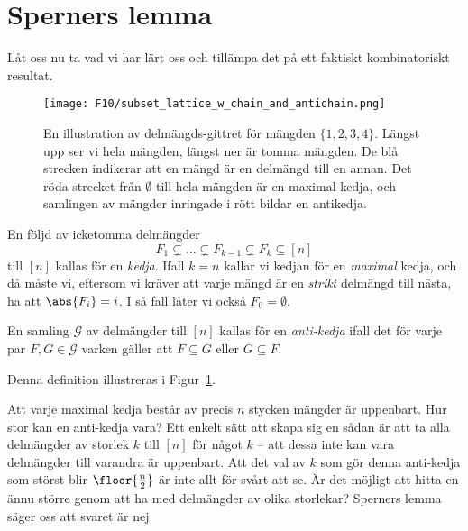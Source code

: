 \documentclass[nobib]{tufte-handout}
\begin{document}
\section{Sperners lemma}

Låt oss nu ta vad vi har lärt oss och tillämpa det på ett faktiskt kombinatoriskt resultat.

\begin{figure}
    \centering
    \texttt{[image: F10/subset\_lattice\_w\_chain\_and\_antichain.png]}
    \caption{En illustration av delmängds-gittret för mängden $\{1,2,3,4\}$. Längst upp ser vi hela mängden, längst ner är tomma mängden. De blå strecken indikerar att en mängd är en delmängd till en annan. Det röda strecket från $\emptyset$ till hela mängden är en maximal kedja, och samlingen av mängder inringade i rött bildar en antikedja.}
    \label{fig:chain_and_antichain}
\end{figure}

\begin{definition}
    En följd av icketomma delmängder
    $$F_1 \subsetneq \ldots \subsetneq F_{k-1} \subsetneq F_k \subseteq [n]$$
    till $[n]$ kallas för en \emph{kedja}. Ifall $k=n$ kallar vi kedjan för en \emph{maximal} kedja, och då måste vi, eftersom vi kräver att varje mängd är en \emph{strikt} delmängd till nästa, ha att $\abs{F_i} = i$. I så fall låter vi också $F_0 = \emptyset$.

    En samling $\mathcal{G}$ av delmängder till $[n]$ kallas för en \emph{anti-kedja} ifall det för varje par $F, G \in \mathcal{G}$ varken gäller att $F \subseteq G$ eller $G \subseteq F$.

    Denna definition illustreras i Figur~\ref{fig:chain_and_antichain}.
\end{definition}

Att varje maximal kedja består av precis $n$ stycken mängder är uppenbart. Hur stor kan en anti-kedja vara? Ett enkelt sätt att skapa sig en sådan är att ta alla delmängder av storlek $k$ till $[n]$ för något $k$ -- att dessa inte kan vara delmängder till varandra är uppenbart. Att det val av $k$ som gör denna anti-kedja som störst blir $\floor{\frac{n}{2}}$ är inte allt för svårt att se. Är det möjligt att hitta en ännu större genom att ha med delmängder av olika storlekar? Sperners lemma säger oss att svaret är nej.
\end{document}
